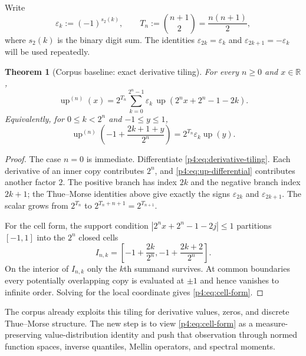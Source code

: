 \documentclass[11pt,oneside]{article}
\newtheorem{theorem}{Theorem}[section]
\theoremstyle{definition}
\theoremstyle{remark}
\newcommand{\R}{\mathbb R}
\newcommand{\Up}{\operatorname{up}}
\begin{document}
Write
\begin{equation}
 \varepsilon_k:=(-1)^{s_2(k)},\qquad
 T_n:=\binom{n+1}{2}=\frac{n(n+1)}2,
 \label{p4:eq:epsilon-Tn}
\end{equation}
where $s_2(k)$ is the binary digit sum.  The identities
$\varepsilon_{2k}=\varepsilon_k$ and
$\varepsilon_{2k+1}=-\varepsilon_k$ will be used repeatedly.

\begin{theorem}[Corpus baseline: exact derivative tiling]
\label{p4:thm:derivative-tiling}
For every $n\geq0$ and $x\in\R$,
\begin{equation}
 \boxed{
 \Up^{(n)}(x)=2^{T_n}
 \sum_{k=0}^{2^n-1}\varepsilon_k\,
 \Up\!\left(2^n x+2^n-1-2k\right).}
 \label{p4:eq:derivative-tiling}
\end{equation}
Equivalently, for $0\leq k<2^n$ and $-1\leq y\leq1$,
\begin{equation}
 \boxed{
 \Up^{(n)}\!\left(-1+\frac{2k+1+y}{2^n}\right)
 =2^{T_n}\varepsilon_k\Up(y).}
 \label{p4:eq:cell-form}
\end{equation}
\end{theorem}

\begin{proof}
The case $n=0$ is immediate.  Differentiate \eqref{p4:eq:derivative-tiling}.  Each derivative
of an inner copy contributes $2^n$, and \eqref{p4:eq:up-differential} contributes another
factor $2$.  The positive branch has index $2k$ and the negative branch index $2k+1$;
the Thue--Morse identities above give exactly the signs $\varepsilon_{2k}$ and
$\varepsilon_{2k+1}$.  The scalar grows from $2^{T_n}$ to
$2^{T_n+n+1}=2^{T_{n+1}}$.

For the cell form, the support condition
$|2^nx+2^n-1-2j|\leq1$ partitions $[-1,1]$ into the $2^n$ closed cells
\[
 I_{n,k}=\left[-1+\frac{2k}{2^n},-1+\frac{2k+2}{2^n}\right].
\]
On the interior of $I_{n,k}$ only the $k$th summand survives.  At common boundaries every
potentially overlapping copy is evaluated at $\pm1$ and hence vanishes to infinite order.
Solving for the local coordinate gives \eqref{p4:eq:cell-form}.
\end{proof}

\begin{remark}
The corpus already exploits this tiling for derivative values, zeros, and discrete
Thue--Morse structure.  The new step is to view \eqref{p4:eq:cell-form} as a
measure-preserving value-distribution identity and push that observation through normed
function spaces, inverse quantiles, Mellin operators, and spectral moments.
\end{remark}
\end{document}
